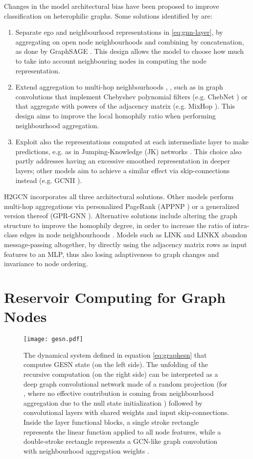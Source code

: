 \documentclass[final,5p,times,twocolumn]{elsarticle}
\begin{document}
Changes in the model architectural bias have been proposed to improve classification on heterophilic graphs.
Some solutions identified by \cite{Zhu2020} are:
\begin{enumerate}
	\item Separate ego and neighbourhood representations in \eqref{eq:gnn-layer}, by aggregating on open node neighbourhoods  and combining by concatenation, as done by GraphSAGE \cite{Hamilton2017}.
	This design allows the model to choose how much to take into account neighbouring nodes in computing the node representation.
	\item Extend aggregation to multi-hop neighbourhoods , , such as in graph convolutions that implement Chebyshev polynomial filters (e.g. ChebNet \cite{Defferrard2016}) or that aggregate with powers of the adjacency matrix (e.g. MixHop \cite{AbuElHaija2019}).
	This design aims to improve the local homophily ratio when performing neighbourhood aggregation.
	\item Exploit also the representations  computed at each intermediate layer  to make predictions, e.g. as in Jumping-Knowledge (JK) networks \cite{Xu2018}.
	This choice also partly addresses having an excessive smoothed representation in deeper layers; other models aim to achieve a similar effect via skip-connections instead (e.g. GCNII \cite{ChenMing2020}).
\end{enumerate}
H2GCN \cite{Zhu2020} incorporates all three architectural solutions.
Other models perform multi-hop aggregations via personalized PageRank (APPNP \cite{Klicpera2019}) or a generalized version thereof (GPR-GNN \cite{Chien2021}).
Alternative solutions include altering the graph structure to improve the homophily degree, in order to increase the ratio of intra-class edges in node neighbourhoods \cite{Gasteiger2019}.
Models such as LINK \cite{Zheleva2009} and LINKX \cite{Lim2021} abandon message-passing altogether, by directly using the adjacency matrix rows as input features to an MLP, thus also losing adaptiveness to graph changes and invariance to node ordering.

\section{Reservoir Computing for Graph Nodes}
\label{sec:gesn}

\begin{figure*}
	\centering
	\texttt{[image: gesn.pdf]}
	\caption{The dynamical system defined in equation \eqref{eq:graphesn} that computes GESN state  (on the left side). The unfolding of the recursive computation (on the right side) can be interpreted as a deep graph convolutional network made of a random projection (for , where no effective contribution is coming from neighbourhood aggregation due to the null state initialization ) followed by  convolutional layers with shared weights  and input skip-connections. Inside the layer functional blocks, a single stroke rectangle represents the linear function  applied to all node features, while a double-stroke rectangle represents a GCN-like graph convolution with neighbourhood aggregation weights .}
	\label{fig:gesn}
\end{figure*}
\end{document}
